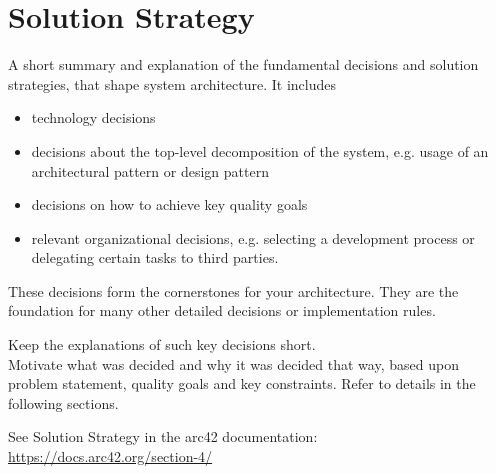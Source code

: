 \section{Solution Strategy}

A short summary and explanation of the fundamental decisions and solution strategies, that shape system architecture. It includes
\begin{itemize}
  \item technology decisions
  \item decisions about the top-level decomposition of the system, e.g. usage of an architectural pattern or design pattern
  \item decisions on how to achieve key quality goals
  \item relevant organizational decisions, e.g. selecting a development process or delegating certain tasks to third parties.
\end{itemize}

These decisions form the cornerstones for your architecture. They are the foundation for many other detailed decisions or implementation rules.

Keep the explanations of such key decisions short.\\
Motivate what was decided and why it was decided that way, based upon problem statement, quality goals and key constraints. Refer to details in the following sections.


See Solution Strategy in the arc42 documentation:
\href{https://docs.arc42.org/section-4/}{https://docs.arc42.org/section-4/}

